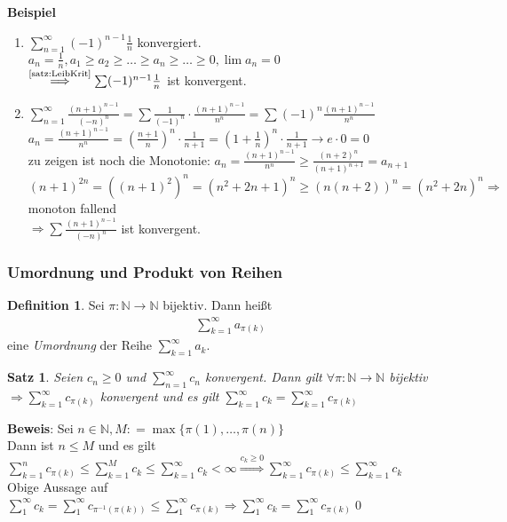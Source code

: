 \documentclass[ngerman,titlepage,twoside, parskip=half*]{scrreprt}
\newcommand*{\N}{\mathbb{N}}
\theoremstyle{plain}
\newtheorem{theorem}{Satz}[section]
\theoremstyle{definition}
\newtheorem{definition}{Definition}
\theoremstyle{remark}
\newcommand*{\coloneqq}{\mathrel{\mathop:}=}
\begin{document}
\textbf{Beispiel} 
\begin{enumerate}
  \item $\sum_{n=1}^\infty (-1)^{n-1}\frac{1}{n}$ konvergiert. $a_n=\frac{1}{n}, a_1\geq a_2\geq \ldots \geq 
    a_n\geq \ldots \geq0, \lim a_n=0$\\
    $\stackrel{\text{\autoref{satz:LeibKrit}}}{\Longrightarrow} \sum (-1)^{n-1}\frac{1}{n}$ ist konvergent.
  \item $\sum_{n=1}^\infty \frac{(n+1)^{n-1}}{(-n)^n}=\sum \frac{1}{(-1)^n}\cdot \frac{(n+1)^{n-1}}{n^n}=\sum (-1)^n
    \frac{(n+1)^{n-1}}{n^n}$\\
    $a_n=\frac{(n+1)^{n-1}}{n^n}=(\frac{n+1}{n})^n\cdot \frac{1}{n+1}=(1+\frac{1}{n})^n\cdot \frac{1}{n+1}\rightarrow e
    \cdot 0=0$\\
    zu zeigen ist noch die Monotonie: $a_n=\frac{(n+1)^{n-1}}{n^n}\geq \frac{(n+2)^n}{(n+1)^{n+1}}=a_{n+1}$\\
    $(n+1)^{2n}=((n+1)^2)^n=(n^2+2n+1)^n\geq (n(n+2))^n=(n^2+2n)^n \Rightarrow$ monoton fallend\\
    $\Rightarrow \sum \frac{(n+1)^{n-1}}{(-n)^n}$ ist konvergent.
\end{enumerate}

\subsubsection{Umordnung und Produkt von Reihen}
\begin{definition}
Sei $\pi \colon\N\rightarrow \N$ bijektiv. Dann heißt
\begin{gather*}\sum_{k=1}^\infty a_{\pi(k)}\end{gather*}
eine \emph{Umordnung} der Reihe $\sum_{k=1}^\infty a_k$.
\end{definition}

\begin{theorem}
\label{satz:umordnung}
Seien $c_n\geq 0$ und $\sum_{n=1}^\infty c_n$ konvergent. Dann gilt $\forall \pi \colon\N\rightarrow \N$ bijektiv
$\Rightarrow \sum_{k=1}^\infty c_{\pi(k)}$ konvergent und es gilt $\sum_{k=1}^\infty c_k=\sum_{k=1}^\infty c_{\pi(k)}$
\end{theorem}
\textbf{Beweis}: Sei $n \in \N, M\coloneqq\max\{\pi(1),\ldots ,\pi(n)\}$\\
Dann ist $n\leq M$ und es gilt $\sum_{k=1}^n c_{\pi(k)}\leq \sum_{k=1}^M c_k\leq \sum_{k=1}^\infty c_k<\infty 
\stackrel{c_k\geq 0}{\Rightarrow} \sum_{k=1}^\infty c_{\pi(k)}\leq \sum_{k=1}^\infty c_k$\\
Obige Aussage auf $\sum_1^\infty c_k=\sum_1^\infty c_{\pi^{-1}(\pi(k))}\leq \sum_1^\infty c_{\pi(k)} \Rightarrow
\sum_1^\infty c_k=\sum_1^\infty c_{\pi(k)}$\qed
\end{document}
